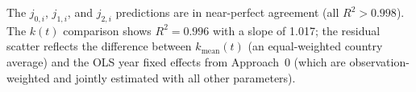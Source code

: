 \documentclass[11pt]{article}
\begin{document}
The $j_{0,i}$, $j_{1,i}$, and $j_{2,i}$ predictions are in near-perfect agreement
(all $R^2 > 0.998$). The $k(t)$ comparison shows $R^2 = 0.996$ with a slope of 1.017;
the residual scatter reflects the difference between $k_{\mathrm{mean}}(t)$
(an equal-weighted country average) and the OLS year fixed effects from Approach~0
(which are observation-weighted and jointly estimated with all other parameters).
\end{document}

